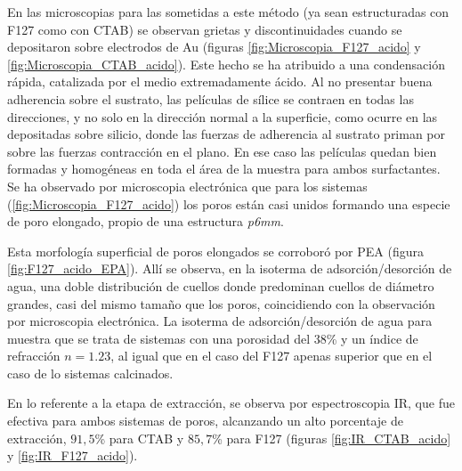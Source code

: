 		 En las microscopias para las \pdm\space sometidas a este método (ya sean estructuradas con F127 como con CTAB) se observan grietas y discontinuidades cuando se depositaron sobre electrodos de Au (figuras \ref{fig:Microscopia_F127_acido} y \ref{fig:Microscopia_CTAB_acido}). Este hecho se ha atribuido a una condensación rápida, catalizada por el medio extremadamente ácido. Al no presentar buena adherencia sobre el sustrato, las películas de sílice se contraen en todas las direcciones, y no solo en la dirección normal a la superficie, como ocurre en las \pdm\space depositadas sobre silicio, donde las fuerzas de adherencia al sustrato priman por sobre las fuerzas contracción en el plano\cite{Sakatani2006,Boissiere2005,Guillemin2010}. En ese caso las películas quedan bien formadas y homogéneas en toda el área de la muestra para ambos surfactantes. Se ha observado por microscopia electrónica que para los sistemas \pdmF\space (\ref{fig:Microscopia_F127_acido}) los  poros están casi unidos formando una especie de poro elongado, propio de una estructura \textit{p6mm}\cite{GonzalezSolveyra2017}. 
	
		 Esta morfología superficial de poros elongados se corroboró por PEA (figura \ref{fig:F127_acido_EPA}). Allí se observa, en la isoterma de adsorción/desorción de agua, una doble distribución de cuellos donde predominan cuellos de diámetro grandes, casi del mismo tamaño que los poros, coincidiendo con la observación por microscopia electrónica.
		 La isoterma de adsorción/desorción de agua para \pdmC\space muestra que se trata de sistemas con una porosidad del 38\% y un índice de refracción $n=1.23$, al igual que en el caso del F127 apenas superior que en el caso de lo sistemas calcinados.
		
		 En lo referente a la etapa de extracción, se observa por espectroscopia IR, que fue efectiva para ambos sistemas de poros, alcanzando un alto porcentaje de extracción, $91,5$\% para CTAB y $85,7$\% para F127 (figuras \ref{fig:IR_CTAB_acido} y \ref{fig:IR_F127_acido}).  	
				
